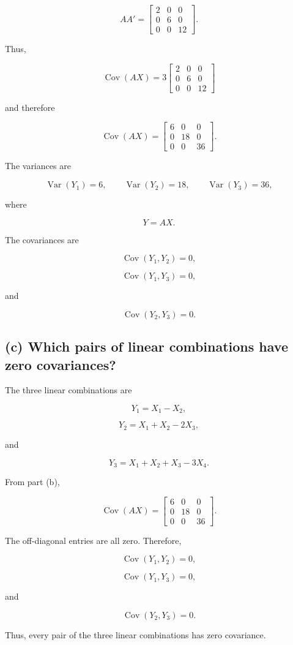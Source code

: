 \documentclass[12pt]{article}
\begin{document}
\[
AA'
=
\begin{bmatrix}
2&0&0\\
0&6&0\\
0&0&12
\end{bmatrix}.
\]

Thus,

\[
\operatorname{Cov}(AX)
=
3
\begin{bmatrix}
2&0&0\\
0&6&0\\
0&0&12
\end{bmatrix}
\]

and therefore

\[
\boxed{
\operatorname{Cov}(AX)
=
\begin{bmatrix}
6&0&0\\
0&18&0\\
0&0&36
\end{bmatrix}
}.
\]

The variances are

\[
\boxed{
\operatorname{Var}(Y_1)=6,\qquad
\operatorname{Var}(Y_2)=18,\qquad
\operatorname{Var}(Y_3)=36,
}
\]

where

\[
Y=AX.
\]

The covariances are

\[
\boxed{
\operatorname{Cov}(Y_1,Y_2)=0,
}
\]

\[
\boxed{
\operatorname{Cov}(Y_1,Y_3)=0,
}
\]

and

\[
\boxed{
\operatorname{Cov}(Y_2,Y_3)=0.
}
\]

\subsection*{(c) Which pairs of linear combinations have zero covariances?}

The three linear combinations are

\[
Y_1=X_1-X_2,
\]

\[
Y_2=X_1+X_2-2X_3,
\]

and

\[
Y_3=X_1+X_2+X_3-3X_4.
\]

From part (b),

\[
\operatorname{Cov}(AX)
=
\begin{bmatrix}
6&0&0\\
0&18&0\\
0&0&36
\end{bmatrix}.
\]

The off-diagonal entries are all zero. Therefore,

\[
\boxed{
\operatorname{Cov}(Y_1,Y_2)=0,
}
\]

\[
\boxed{
\operatorname{Cov}(Y_1,Y_3)=0,
}
\]

and

\[
\boxed{
\operatorname{Cov}(Y_2,Y_3)=0.
}
\]

Thus, every pair of the three linear combinations has zero covariance.
\end{document}
